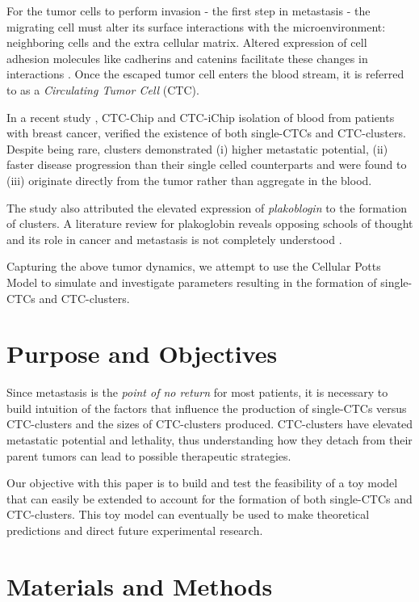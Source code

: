 \documentclass[12pt]{article}
\begin{document}
For the tumor cells to perform invasion - the first step in metastasis - the migrating cell must alter its surface interactions with the microenvironment: neighboring cells and the extra cellular matrix. Altered expression of cell adhesion molecules like cadherins and catenins facilitate these changes in interactions \cite{Aktary2012}\cite{Zhurinsky2000}. Once the escaped tumor cell enters the blood stream, it is referred to as a \emph{Circulating Tumor Cell} (CTC).

In a recent study \cite{Aceto2014}, CTC-Chip and CTC-iChip isolation of blood from patients with breast cancer, verified the existence of both single-CTCs and CTC-clusters. Despite being rare,  clusters demonstrated (i) higher metastatic potential, (ii) faster disease progression than their single celled counterparts and were found to (iii) originate directly from the tumor rather than aggregate in the blood.

The study also attributed the elevated expression of \emph{plakoblogin} to the formation of clusters. A literature review for plakoglobin reveals opposing schools of thought and its role in cancer and metastasis is not completely understood \cite{Aktary2012}\cite{Zhurinsky2000}.

Capturing the above tumor dynamics, we attempt to use the Cellular Potts Model to simulate and investigate parameters resulting in the formation of single-CTCs and CTC-clusters.

\section{Purpose and Objectives}
Since metastasis is the \emph{point of no return} for most patients, it is necessary to build intuition of the factors that influence the production of single-CTCs versus CTC-clusters and the sizes of CTC-clusters produced. CTC-clusters have elevated metastatic potential and lethality, thus understanding how they detach from their parent tumors can lead to possible therapeutic strategies.

Our objective with this paper is to build and test the feasibility of a toy model that can easily be extended to account for the formation of both single-CTCs and CTC-clusters. This toy model can eventually be used to make theoretical predictions and direct future experimental research.

\section{Materials and Methods}
\end{document}
